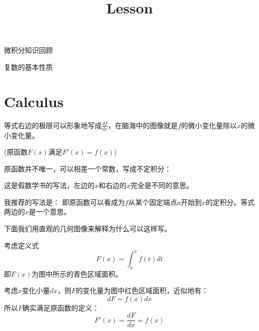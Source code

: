 \documentclass[CJK]{beamer}
\title{Lesson }
\author{}
\date{}
\begin{document}


\begin{frame}
\bch
\bitem
\item{微积分知识回顾}
\item{复数的基本性质}
\eitem
\ech
\end{frame}

\section{Calculus}

\begin{frame}
\bch
{}

等式右边的极限可以形象地写成$\frac{df}{dx}$，在脑海中的图像就是$f$的微小变化量除以$x$的微小变化量。

\ech
\end{frame}

\begin{frame}
\bch
{}
(原函数$F(x)$满足$F'(x) = f(x)$)

\ech
\end{frame}

\begin{frame}
\bch
原函数并不唯一，可以相差一个常数，写成不定积分：

这是假数学书的写法，左边的$x$和右边的$x$完全是不同的意思。

我推荐的写法是：
即原函数可以看成为$f$从某个固定端点$a$开始到$x$的定积分。等式两边的$x$是一个意思。

下面我们用直观的几何图像来解释为什么可以这样写。

\ech
\end{frame}


\begin{frame}
\bch
考虑定义式$$ F(x) = \int_a^x f(t) dt$$
即$F(x)$为图中所示的青色区域面积。

考虑$x$变化小量$dx$，则$F$的变化量为图中红色区域面积，近似地有：
$$d F = f(x) dx$$
所以$F$确实满足原函数的定义：
$$F'(x) = \frac{dF}{dx} = f(x)$$

\emini
{}
\emini

\ech
\end{frame}
\end{document}
